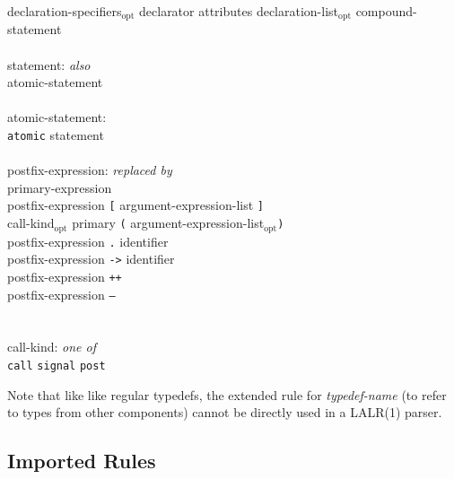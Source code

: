 \documentclass[11pt,letterpaper]{article}
\newcommand{\kw}[1]{{\tt #1}}
\newcommand{\opt}{$_{\mbox{opt}}$\xspace}
\begin{document}
\begin{tabbing}
\>	declaration-specifiers\opt declarator attributes declaration-list\opt compound-statement\\
\\
statement: \emph{also}\\
\>	atomic-statement\\
\\
atomic-statement:\\
\>	\kw{atomic} statement\\
\\
postfix-expression: \emph{replaced by}\\
\>	primary-expression\\
\>	postfix-expression \kw{[} argument-expression-list \kw{]}\\
\>	call-kind\opt primary \kw{(} argument-expression-list\opt \kw{)}\\
\>	postfix-expression \kw{.} identifier\\
\>	postfix-expression \kw{->} identifier\\
\>	postfix-expression \kw{++}\\
\>	postfix-expression \kw{--}\\
\\\\
call-kind: \emph{one of}\\
\>	\kw{call} \kw{signal} \kw{post}
\end{tabbing} \rm

Note that like like regular typedefs, the extended rule for
\emph{typedef-name} (to refer to types from other components) cannot be
directly used in a LALR(1) parser.

\subsection{Imported Rules}
\label{sec:imported}
\end{document}
